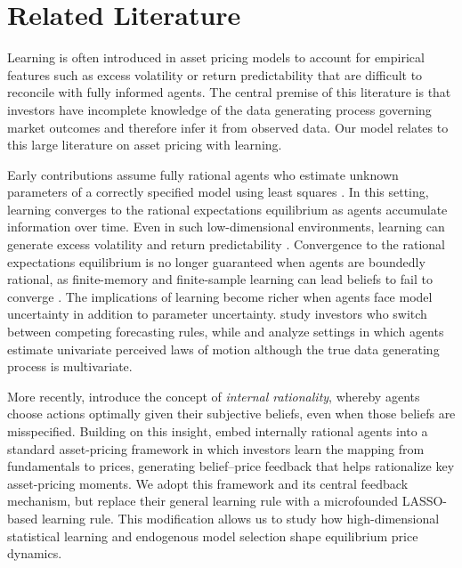 \documentclass[11pt]{article}
\begin{document}
\section{Related Literature}\label{sec:literature}

Learning is often introduced in asset pricing models to account for empirical features such as excess volatility or return predictability that are difficult to reconcile with fully informed agents.
The central premise of this literature is that investors have incomplete knowledge of the data generating process governing market outcomes and therefore infer it from observed data.
Our model relates to this large literature on asset pricing with learning. 

Early contributions assume fully rational agents who estimate unknown parameters of a correctly specified model using least squares \citep{Marcet1989}. 
In this setting, learning converges to the rational expectations equilibrium as agents accumulate information over time. 
Even in such low-dimensional environments, learning can generate excess volatility and return predictability \citep{Timmermann1993,Timmermann1996}. 
Convergence to the rational expectations equilibrium is no longer guaranteed when agents are boundedly rational, as finite-memory and finite-sample learning can lead beliefs to fail to converge \citep{Honkapohja2003}. 
The implications of learning become richer when agents face model uncertainty in addition to parameter uncertainty. 
\citet{barberis1998model} study investors who switch between competing forecasting rules, while \citet{hong2007simple} and \citet{Branch2010} analyze settings in which agents estimate univariate perceived laws of motion although the true data generating process is multivariate.

More recently, \citet{adam2011internal} introduce the concept of \textit{internal rationality}, whereby agents choose actions optimally given their subjective beliefs, even when those beliefs are misspecified. 
Building on this insight, \citet{Adam2016} embed internally rational agents into a standard asset-pricing framework in which investors learn the mapping from fundamentals to prices, generating belief--price feedback that helps rationalize key asset-pricing moments. 
We adopt this framework and its central feedback mechanism, but replace their general learning rule with a microfounded LASSO-based learning rule. 
This modification allows us to study how high-dimensional statistical learning and endogenous model selection shape equilibrium price dynamics.
\end{document}

